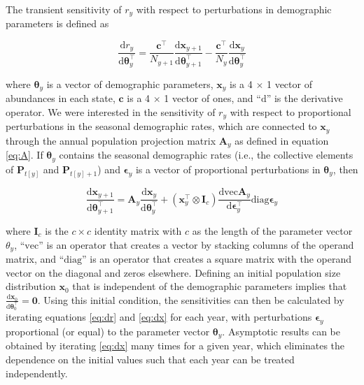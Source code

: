 \documentclass[11pt]{article}
\begin{document}
The transient sensitivity of $r_y$ with respect to perturbations in demographic parameters
is defined as
%
\begin{linenomath*}
\begin{equation} \label{eq:dr}
\frac{\textrm{d}r_y}{\textrm{d}\boldsymbol\theta_y^\top} = 
    \frac{\mathbf{c}^\top}{N_{y+1}} \frac{\textrm{d}\mathbf{x}_{y+1}}
            {\textrm{d}\boldsymbol\theta_{y+1}^\top}-
        \frac{\mathbf{c}^\top}{N_{y}} \frac{\textrm{d}\mathbf{x}_y}
            {\textrm{d}\boldsymbol\theta_y^\top}
\end{equation}
\end{linenomath*}
%
where $\boldsymbol\theta_y$ is a vector of demographic parameters, 
$\mathbf{x}_y$ is a 4 $\times$ 1 vector of abundances in each state,
$\mathbf{c}$ is a 4 $\times$ 1 vector of ones,
and ``$\textrm{d}$'' is the derivative operator.
We were interested in the sensitivity of $r_y$ with respect to proportional 
perturbations in the seasonal demographic rates,
which are connected to $\mathbf{x}_y$ through the annual population projection matrix
$\mathbf{A}_y$ as defined in equation \ref{eq:A}.
If $\boldsymbol\theta_y$ contains the seasonal demographic rates 
(i.e., the collective elements of $\mathbf{P}_{t[y]}$ and $\mathbf{P}_{t[y]+1}$)
and $\boldsymbol\epsilon_y$ is a vector of proportional perturbations in
$\boldsymbol\theta_y$,
then 
%
\begin{linenomath*}
\begin{equation} \label{eq:dx}
\frac{\textrm{d}\mathbf{x}_{y+1}}{\textrm{d}\boldsymbol\theta_{y+1}^\top} = 
    \mathbf{A}_y \frac{\textrm{d}\mathbf{x}_{y}}{\textrm{d}\boldsymbol\theta_y^\top}+
        \left(\mathbf{x}_{y}^\top \otimes \mathbf{I}_c \right)
            \frac{\textrm{dvec}\mathbf{A}_y}{\textrm{d}\boldsymbol\epsilon_y^\top}
                \textrm{diag}\boldsymbol\epsilon_y
\end{equation}
\end{linenomath*}
%
where $\mathbf{I}_c$ is the $c \times c$ identity matrix with $c$ as the length
of the parameter vector $\theta_y$,
``$\textrm{vec}$'' is an operator that creates a vector 
by stacking columns of the operand matrix,
and ``$\textrm{diag}$'' is an operator that creates a square matrix with the operand vector on
the diagonal and zeros elsewhere. 
Defining an initial population size distribution $\mathbf{x}_0$ 
that is independent of the demographic parameters implies that 
$\frac{\textrm{d}\mathbf{x}_0}{\textrm{d}\boldsymbol\theta_0^\top} = \mathbf{0}$.
Using this initial condition,
the sensitivities can then be calculated by iterating equations \ref{eq:dr} and \ref{eq:dx}
for each year, with perturbations $\boldsymbol\epsilon_y$ proportional (or equal)
to the parameter vector $\boldsymbol\theta_y$.
Asymptotic results can be obtained by iterating \ref{eq:dx} many times for a given year,
which eliminates the dependence on the initial values such that each year can be treated
independently. 
\end{document}
